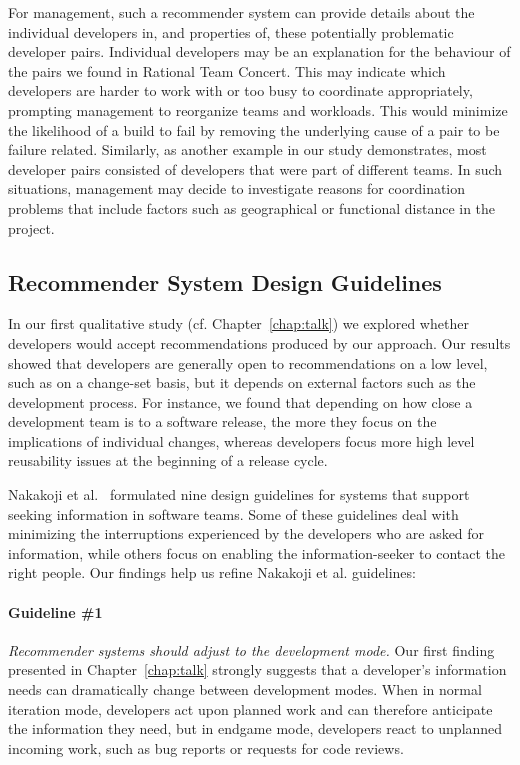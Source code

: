 For management, such a recommender system can provide details about the
individual developers in, and properties of, these potentially problematic
developer pairs. Individual developers may be an explanation for the behaviour of
the pairs we found in Rational Team Concert. This may indicate which developers are
harder to work with or too busy to coordinate appropriately, prompting management
to reorganize teams and workloads. This would minimize the likelihood of a build
to fail by removing the underlying cause of a pair to be failure related.
Similarly, as another example in our study demonstrates, most developer pairs
consisted of developers that were part of different teams. In such
situations, management may decide to investigate reasons for coordination
problems that include factors such as geographical or functional distance in the project.

\subsection{Recommender System Design Guidelines}
\label{sec:sub:tools}
In our first qualitative study (cf. Chapter~\ref{chap:talk}) we explored whether developers would accept recommendations produced by our approach.
Our results showed that developers are generally open to recommendations on a low level, such as on a change-set basis, but it depends on external factors such as the development process.
For instance, we found that depending on how close a development team is to a software release, the more they focus on the implications of individual changes, whereas developers focus more high level reusability issues at the beginning of a release cycle.

Nakakoji et al.~\cite{nakakoji2010:rdc} formulated nine design guidelines for systems that support seeking information in software teams. Some of these guidelines deal with minimizing the interruptions experienced by the developers who are asked for information, while others focus on enabling the information-seeker to contact the right people. Our findings help us refine Nakakoji et al. guidelines:

\paragraph{Guideline \#1} \emph{Recommender systems should adjust to the development mode.}
Our first finding presented in Chapter~\ref{chap:talk} strongly suggests that a developer's information needs can dramatically change between development modes. 
%
When in normal iteration mode, developers act upon planned work and can therefore anticipate the information they need, but in endgame mode, developers react to unplanned incoming work, such as bug reports or requests for code reviews. 

